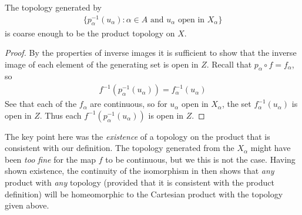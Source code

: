       \begin{claim}
        The topology generated by 
        \begin{align*}
          \{p_\alpha^{-1}(u_\alpha):\alpha\in A\text{ and } u_\alpha\text{ open in }X_\alpha\}
        \end{align*}
        is coarse enough to be the product topology on $X$.
        \begin{proof}
          By the properties of inverse images it is sufficient to show that the inverse image of each element of the generating set is open in $Z$.
          Recall that $p_\alpha\circ f=f_\alpha$, so 
          \begin{align*}
            f^{-1}(p_\alpha^{-1}(u_\alpha)) = f_\alpha^{-1}(u_\alpha)
          \end{align*}
          See that each of the $f_\alpha$ are continuous, so for $u_\alpha$ open in $X_\alpha$, the set $f_\alpha^{-1}(u_\alpha)$ is open in $Z$.
          Thus each $f^{-1}(p_\alpha^{-1}(u_\alpha))$ is open in $Z$.
        \end{proof}
      \end{claim}

      \begin{rmk}
        The key point here was the \emph{existence} of a topology on the product that is consistent with our definition. 
        The topology generated from the $X_\alpha$ might have been \emph{too fine} for the map $f$ to be continuous, but we this is not the case.
        Having shown existence, the continuity of the isomorphism in  then shows that \emph{any} product with \emph{any}  topology (provided that it is consistent with the product definition) will be homeomorphic to the Cartesian product with the topology given above.
      \end{rmk}

